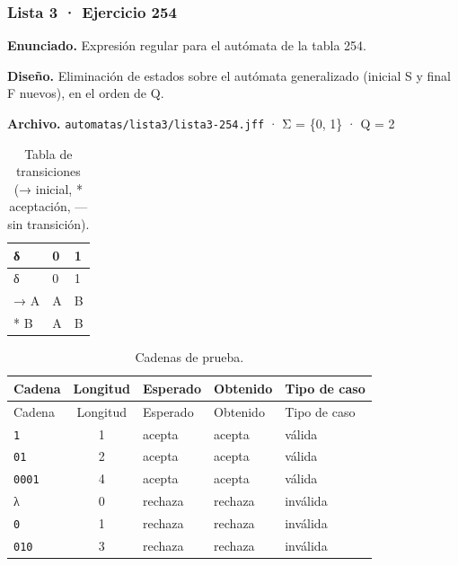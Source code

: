 
\hypertarget{lista-3-ejercicio-254}{%
\subsubsection{Lista 3 · Ejercicio 254}\label{lista-3-ejercicio-254}}

\textbf{Enunciado.} Expresión regular para el autómata de la tabla 254.

\textbf{Diseño.} Eliminación de estados sobre el autómata generalizado (inicial S y final F nuevos), en el orden de Q.

\textbf{Archivo.} \texttt{automatas/lista3/lista3-254.jff} · Σ = \{0, 1\} · \textbar Q\textbar{} = 2

\begin{longtable}[]{@{}lll@{}}
\caption{Tabla de transiciones (→ inicial, * aceptación, --- sin transición).}\tabularnewline
\toprule\noalign{}
δ & 0 & 1 \\
\midrule\noalign{}
\endfirsthead
\toprule\noalign{}
δ & 0 & 1 \\
\midrule\noalign{}
\endhead
\bottomrule\noalign{}
\endlastfoot
→ A & A & B \\
* B & A & B \\
\end{longtable}

\begin{longtable}[]{@{}lclll@{}}
\caption{Cadenas de prueba.}\tabularnewline
\toprule\noalign{}
Cadena & Longitud & Esperado & Obtenido & Tipo de caso \\
\midrule\noalign{}
\endfirsthead
\toprule\noalign{}
Cadena & Longitud & Esperado & Obtenido & Tipo de caso \\
\midrule\noalign{}
\endhead
\bottomrule\noalign{}
\endlastfoot
\texttt{1} & 1 & acepta & acepta & válida \\
\texttt{01} & 2 & acepta & acepta & válida \\
\texttt{0001} & 4 & acepta & acepta & válida \\
λ & 0 & rechaza & rechaza & inválida \\
\texttt{0} & 1 & rechaza & rechaza & inválida \\
\texttt{010} & 3 & rechaza & rechaza & inválida \\
\end{longtable}

